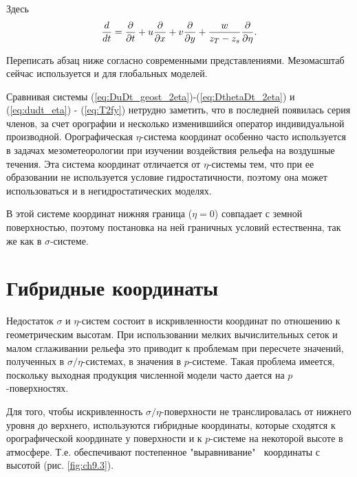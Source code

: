 Здесь 
    \begin{equation*}
        \displaystyle\frac{d }{d t}=\displaystyle\frac{\partial }{\partial t} + u\displaystyle\frac{\partial }{\partial x} + v\displaystyle\frac{\partial }{\partial y} + \frac{w}{z_T-z_s}\displaystyle\frac{\partial }{\partial \eta}.
    \end{equation*}
   \begin{warn}
        Переписать абзац ниже согласно современными представлениями. Мезомасштаб сейчас используется и для глобальных моделей. 
   \end{warn}
Сравнивая системы (\ref{eq:DuDt_geost_2eta})-(\ref{eq:DthetaDt_2eta}) и (\ref{eq:dudt_eta}) - (\ref{eq:T2fy}) нетрудно заметить, что в последней появилась серия членов, за счет орографии и несколько изменившийся оператор индивидуальной производной. Орографическая $\eta$-система координат особенно часто используется в задачах мезометеорологии при изучении
воздействия рельефа на воздушные течения. Эта система координат отличается от $\eta$-системы тем, что при ее образовании не используется условие гидростатичности, поэтому она может использоваться и в негидростатических моделях. 

В этой системе координат нижняя граница ($\eta=0$) совпадает с земной поверхностью, поэтому постановка на ней граничных условий естественна, так же как в $\sigma$-системе.

\section{{\color{done}Гибридные координаты}}
Недостаток $\sigma$ и $\eta$-систем состоит в искривленности координат по отношению к геометрическим высотам. При использовании мелких вычислительных сеток и малом сглаживании рельефа это приводит к проблемам при пересчете значений, полученных в $\sigma/\eta$-системах, в значения в $p$-системе. Такая проблема имеется, поскольку выходная продукция  численной модели часто дается на $p$-поверхностях.

Для того, чтобы искривленность $\sigma/\eta$-поверхности не транслировалась от нижнего уровня до верхнего, используются гибридные координаты, которые сходятся к орографической координате у поверхности и к $p$-системе на некоторой высоте в атмосфере. Т.е. обеспечивают постепенное "выравнивание" $\:$ координаты с высотой (рис. \ref{fig:ch9.3}).

